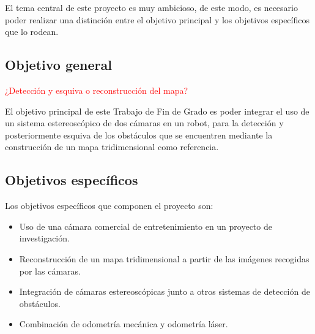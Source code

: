 

El tema central de este proyecto es muy ambicioso, de este modo, es necesario
poder realizar una distinción entre el objetivo principal y los objetivos
específicos que lo rodean.

\subsection{Objetivo general}

\textcolor{red}{¿Detección y esquiva o reconstrucción del mapa?}


El objetivo principal de este Trabajo de Fin de Grado es poder integrar el uso
de un sistema estereoscópico de dos cámaras en un robot, para la detección y
posteriormente esquiva de los obstáculos que se encuentren mediante la
construcción de un mapa tridimensional como referencia.

\subsection{Objetivos específicos}

Los objetivos específicos que componen el proyecto son:
\begin{itemize}
  \item Uso de una cámara comercial de entretenimiento en un proyecto de
  investigación.
  \item Reconstrucción de un mapa tridimensional a partir de las imágenes
  recogidas por las cámaras.
  \item Integración de cámaras estereoscópicas junto a otros sistemas de
  detección de obstáculos.
  \item Combinación de odometría mecánica y odometría láser.
\end{itemize}

